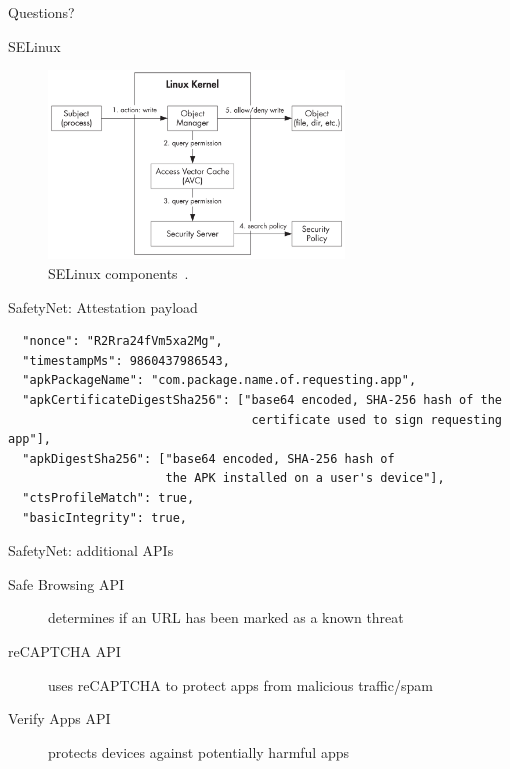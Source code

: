 \documentclass[
    11pt,%
    aspectratio=169,%
]{beamer}
\begin{document}
%
%
\begin{frame}[standout]
  Questions?
\end{frame}



\appendix




\begin{frame}[fragile]{SELinux}
\begin{figure}[H]
  \centering
  \includegraphics[width=0.7\textwidth]{img/selinux}
  \caption{SELinux components~\cite{android_sec_internals}.}
  \label{fig:selinux}
\end{figure}
\end{frame}



\begin{frame}[fragile]{SafetyNet: Attestation payload}
\begin{verbatim}
  "nonce": "R2Rra24fVm5xa2Mg",
  "timestampMs": 9860437986543,
  "apkPackageName": "com.package.name.of.requesting.app",
  "apkCertificateDigestSha256": ["base64 encoded, SHA-256 hash of the
                                  certificate used to sign requesting app"],
  "apkDigestSha256": ["base64 encoded, SHA-256 hash of
                      the APK installed on a user's device"],
  "ctsProfileMatch": true,
  "basicIntegrity": true,
\end{verbatim}
\end{frame}



\begin{frame}{SafetyNet: additional APIs}
\begin{description}
  \item[Safe Browsing API] determines if an URL has been marked as a known threat
  \item[reCAPTCHA API] uses reCAPTCHA to protect apps from malicious traffic/spam
  \item[Verify Apps API] protects devices against potentially harmful apps
\end{description}
\end{frame}
\end{document}
